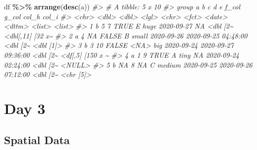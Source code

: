 \documentclass[
]{report}
\newenvironment{Shaded}{\begin{snugshade}}{\end{snugshade}}
\newcommand{\CommentTok}[1]{\textcolor[rgb]{0.56,0.35,0.01}{\textit{#1}}}
\newcommand{\KeywordTok}[1]{\textcolor[rgb]{0.13,0.29,0.53}{\textbf{#1}}}
\newcommand{\NormalTok}[1]{#1}
\newcommand{\OperatorTok}[1]{\textcolor[rgb]{0.81,0.36,0.00}{\textbf{#1}}}
\newcommand{\StringTok}[1]{\textcolor[rgb]{0.31,0.60,0.02}{#1}}
\begin{document}
\begin{Shaded}
\begin{Highlighting}[]
\NormalTok{df }\OperatorTok{\%\textgreater{}\%}
\StringTok{  }\KeywordTok{arrange}\NormalTok{(}\KeywordTok{desc}\NormalTok{(a))}
\CommentTok{\#\textgreater{} \# A tibble: 5 x 10}
\CommentTok{\#\textgreater{}   group     a     b c     d     e      f\_col      g\_col               col\_h    col\_i           }
\CommentTok{\#\textgreater{}   \textless{}chr\textgreater{} \textless{}dbl\textgreater{} \textless{}dbl\textgreater{} \textless{}lgl\textgreater{} \textless{}chr\textgreater{} \textless{}fct\textgreater{}  \textless{}date\textgreater{}     \textless{}dttm\textgreater{}              \textless{}list\textgreater{}   \textless{}list\textgreater{}          }
\CommentTok{\#\textgreater{} 1 b         5     7 TRUE  E     huge   2020{-}09{-}27 NA                  \textless{}dbl [2\textasciitilde{} \textless{}dbl[,11] [32 x\textasciitilde{}}
\CommentTok{\#\textgreater{} 2 a         4    NA FALSE B     small  2020{-}09{-}26 2020{-}09{-}25 04:48:00 \textless{}dbl [2\textasciitilde{} \textless{}dbl [1]\textgreater{}       }
\CommentTok{\#\textgreater{} 3 b         3    10 FALSE \textless{}NA\textgreater{}  big    2020{-}09{-}24 2020{-}09{-}27 09:36:00 \textless{}dbl [2\textasciitilde{} \textless{}df[,5] [150 x \textasciitilde{}}
\CommentTok{\#\textgreater{} 4 a         1     9 TRUE  A     tiny   NA         2020{-}09{-}24 02:24:00 \textless{}dbl [2\textasciitilde{} \textless{}NULL\textgreater{}          }
\CommentTok{\#\textgreater{} 5 b        NA     8 NA    C     medium 2020{-}09{-}25 2020{-}09{-}26 07:12:00 \textless{}dbl [2\textasciitilde{} \textless{}chr [5]\textgreater{}}
\end{Highlighting}
\end{Shaded}

\cleardoublepage

\hypertarget{part-day-3}{%
\part{Day 3}\label{part-day-3}}

\hypertarget{spatial-data}{%
\chapter{Spatial Data}\label{spatial-data}}
\end{document}
